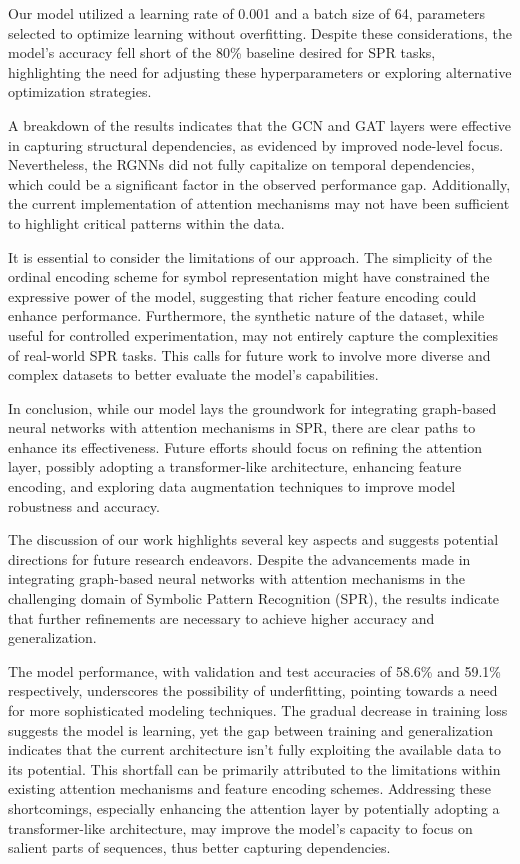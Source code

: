 \documentclass{article}
\begin{document}
Our model utilized a learning rate of 0.001 and a batch size of 64, parameters selected to optimize learning without overfitting. Despite these considerations, the model's accuracy fell short of the 80\% baseline desired for SPR tasks, highlighting the need for adjusting these hyperparameters or exploring alternative optimization strategies.

A breakdown of the results indicates that the GCN and GAT layers were effective in capturing structural dependencies, as evidenced by improved node-level focus. Nevertheless, the RGNNs did not fully capitalize on temporal dependencies, which could be a significant factor in the observed performance gap. Additionally, the current implementation of attention mechanisms may not have been sufficient to highlight critical patterns within the data. 

It is essential to consider the limitations of our approach. The simplicity of the ordinal encoding scheme for symbol representation might have constrained the expressive power of the model, suggesting that richer feature encoding could enhance performance. Furthermore, the synthetic nature of the dataset, while useful for controlled experimentation, may not entirely capture the complexities of real-world SPR tasks. This calls for future work to involve more diverse and complex datasets to better evaluate the model's capabilities.

In conclusion, while our model lays the groundwork for integrating graph-based neural networks with attention mechanisms in SPR, there are clear paths to enhance its effectiveness. Future efforts should focus on refining the attention layer, possibly adopting a transformer-like architecture, enhancing feature encoding, and exploring data augmentation techniques to improve model robustness and accuracy.

The discussion of our work highlights several key aspects and suggests potential directions for future research endeavors. Despite the advancements made in integrating graph-based neural networks with attention mechanisms in the challenging domain of Symbolic Pattern Recognition (SPR), the results indicate that further refinements are necessary to achieve higher accuracy and generalization.

The model performance, with validation and test accuracies of 58.6\% and 59.1\% respectively, underscores the possibility of underfitting, pointing towards a need for more sophisticated modeling techniques. The gradual decrease in training loss suggests the model is learning, yet the gap between training and generalization indicates that the current architecture isn't fully exploiting the available data to its potential. This shortfall can be primarily attributed to the limitations within existing attention mechanisms and feature encoding schemes. Addressing these shortcomings, especially enhancing the attention layer by potentially adopting a transformer-like architecture, may improve the model's capacity to focus on salient parts of sequences, thus better capturing dependencies.
\end{document}
